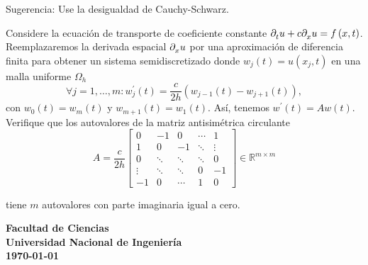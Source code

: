 \documentclass[spanish,addpoints,answers,a4paper,8pt]{exam}
\theoremstyle{definition}
\newcommand{\unmarkedfntext}[1]{%
	\begingroup
	\renewcommand\thefootnote{}\footnote{#1}%
	\addtocounter{footnote}{-1}%
	\endgroup
}
\begin{document}
\begin{questions}
    Sugerencia: Use la desigualdad de Cauchy-Schwarz.

    \question[5]

    Considere la ecuación de transporte de coeficiente constante
    \begin{math}
        \difcp{u}{t}+
        c\difcp{u}{x}=
        f\left(x,t\right)
    \end{math}.
    Reemplazaremos la derivada espacial $\difcp{u}{x}$ por una
    aproximación de diferencia finita para obtener un sistema
    semidiscretizado donde $w_{j}\left(t\right)=u\left(x_{j},t\right)$
    en una malla uniforme $\Omega_{h}$
    \begin{equation*}
        \forall j=1,\dotsc,m:
        w^{\prime}_{j}\left(t\right)=
        \dfrac{c}{2h}
        \left(
        w_{j-1}\left(t\right)-
        w_{j+1}\left(t\right)
        \right),
    \end{equation*}
    con
    \begin{math}
        w_{0}\left(t\right)=
        w_{m}\left(t\right)
    \end{math}
    y
    \begin{math}
        w_{m+1}\left(t\right)=
        w_{1}\left(t\right)
    \end{math}.
    Así, tenemos
    \begin{math}
        w^{\prime}\left(t\right)=Aw\left(t\right)
    \end{math}.
    Verifique que los autovalores de la matriz antisimétrica
    circulante
    \begin{equation*}
        A=
        \frac{c}{2h}
        \begin{bmatrix}
            0      & -1     & 0      & \cdots & 1      \\
            1      & 0      & -1     & \ddots & \vdots \\
            0      & \ddots & \ddots & \ddots & 0      \\
            \vdots & \ddots & \ddots & 0      & -1     \\
            -1     & 0      & \cdots & 1      & 0
        \end{bmatrix}\in\mathbb{R}^{m\times m}
    \end{equation*}

    tiene $m$ autovalores con parte imaginaria igual a cero.
\end{questions}
\vfill
\begin{flushright}\bfseries
    Facultad de Ciencias\\[2mm]
    Universidad Nacional de Ingeniería\\[2mm]
    \today%
\end{flushright}
\end{document}
